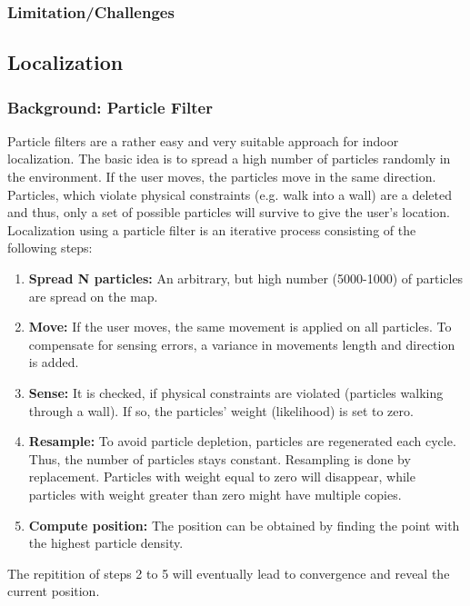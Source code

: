 \documentclass[12pt]{article}
\begin{document}
\pagebreak

\subsubsection{Limitation/Challenges}


\subsection{Localization} \label{sec:localization}

\subsubsection{Background: Particle Filter} \label{sec:particlefilter}
Particle filters are a rather easy and very suitable approach for indoor localization. The basic idea is to spread a high number of particles randomly in the environment. If the user moves, the particles move in the same direction. Particles, which violate physical constraints (e.g. walk into a wall) are a deleted and thus, only a set of possible particles will survive to give the user's location. \\
Localization using a particle filter is an iterative process consisting of the following steps:
\begin{enumerate}
	\item \textbf{Spread N particles:} An arbitrary, but high number (5000-1000) of particles are spread on the map.
	\item \textbf{Move:} If the user moves, the same movement is applied on all particles. To compensate for sensing errors, a variance in movements length and direction is added.
	\item \textbf{Sense:} It is checked, if physical constraints are violated (particles walking through a wall). If so, the particles' weight (likelihood) is set to zero.
	\item \textbf{Resample:} To avoid particle depletion, particles are regenerated each cycle. Thus, the number of particles stays constant. Resampling is done by replacement. Particles with weight equal to zero will disappear, while particles with weight greater than zero might have multiple copies.
	\item \textbf{Compute position:} The position can be obtained by finding the point with the highest particle density.
\end{enumerate}
The repitition of steps 2 to 5 will eventually lead to convergence and reveal the current position.
\end{document}

